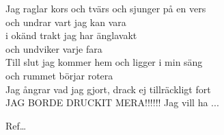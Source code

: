 \begin{SongText}[Mer öl]
\begin{SongVerse}
        Jag raglar kors och tvärs och sjunger på en vers\\%
        och undrar vart jag kan vara\\%
        i okänd trakt jag har änglavakt\\%
        och undviker varje fara\\%
        Till slut jag kommer hem och ligger i min säng\\%
        och rummet börjar rotera\\%
        Jag ångrar vad jag gjort, drack ej tillräckligt fort\\%
        JAG BORDE DRUCKIT MERA!!!!!! Jag vill ha ...
    \end{SongVerse}
    \begin{SongVerse}
        Ref…
    \end{SongVerse}
\end{SongText}
